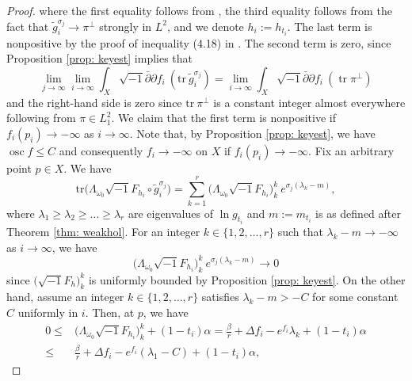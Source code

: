 \documentclass[a4, 12pt, 
]{amsart}
\numberwithin{equation}{section}
\theoremstyle{plain}
\theoremstyle{definition}
\theoremstyle{remark}
\begin{document}
\begin{proof}
    where the first equality follows from \cite[Proposition (3.4.9)]{LT}, the third equality follows from the fact that $\tilde{g}^{\sigma_j}_i\to \pi^\perp$ strongly in $L^2$, and we denote $h_i:=h_{t_i}$.
    The last term is nonpositive by the proof of inequality (4.18) in \cite{UY}.
    The second term is zero, since Proposition \ref{prop: keyest} implies that 
    \begin{equation*}
        \lim_{j\to\infty}\lim_{i\to\infty}\int_{X}\sqrt{-1}\bar{\partial}\partial f_i\  (\mathrm{tr}\ \tilde{g}^{\sigma_j}_i)=\lim_{i\to\infty}\int_X \sqrt{-1}\bar{\partial}\partial f_i\ (\operatorname{tr}\pi^\perp)
    \end{equation*}
    and the right-hand side is zero since $\mathrm{tr} \ \pi^\perp$ is a constant integer almost everywhere following from $\pi\in L^2_1$. We claim that the first term is nonpositive if $f_i(p_i)\to-\infty$ as $i\to\infty$. Note that, by Proposition \ref{prop: keyest}, we have $\operatorname{osc} f\le C$ and consequently $f_i\to -\infty$ on $X$ if $f_i(p_i)\to-\infty$. Fix an arbitrary point $p\in X$. We have 
    \begin{equation*}
        \mathrm{tr}\big(\Lambda_{\omega_0}\sqrt{-1}F_{h_i}\circ\tilde{g}^{\sigma_j}_i\big)=\sum_{k=1}^r \big(\Lambda_{\omega_0}\sqrt{-1}F_{h_i}\big)^k_k \ e^{\sigma_j(\lambda_k-m)},
    \end{equation*}
    where $\lambda_1\ge\lambda_2\ge\dots\ge\lambda_r$ are eigenvalues of $\ln g_{t_i}$ and $m:=m_{t_i}$ is as defined after Theorem \ref{thm: weakhol}.
    For an integer $k\in\{1,2,\dots,r\}$ such that $\lambda_k-m\to-\infty$ as $i\to\infty$, we have
    \begin{equation}\label{eq: forslowk}
        \big(\Lambda_{\omega_0}\sqrt{-1}F_{h_i}\big)^k_k \ e^{\sigma_j(\lambda_k-m)}\to 0
    \end{equation}
    since $(\sqrt{-1}F_h\big)^k_k$ is uniformly bounded by Proposition \ref{prop: keyest}. On the other hand, assume an integer $k\in\{1,2,\dots,r\}$ satisfies $\lambda_k-m> -C$ for some constant $C$ uniformly in $i$. Then, at $p$, we have
    \begin{equation}\label{eq: diverge}
    \begin{aligned}
        0\le& \big(\Lambda_{\omega_0}\sqrt{-1}F_{h_i}\big)^k_k+(1-t_i)\alpha=\frac{\beta}{r}+\Delta f_i-e^{f_i}\lambda_k+(1-t_i)\alpha\\
        \le&\frac{\beta}{r}+\Delta f_i-e^{f_i}(\lambda_1-C)+(1-t_i)\alpha,
    \end{aligned}
    \end{equation}

\end{proof}
\end{document}
